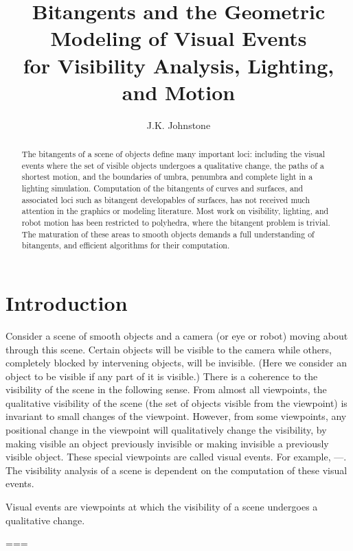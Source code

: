 \documentclass[11pt]{article}
\begin{document}
\title{Bitangents and the Geometric Modeling of Visual Events\\
	for Visibility Analysis, Lighting, and Motion}
\author{J.K. Johnstone}
\maketitle
	
\begin{abstract}
The bitangents of a scene of objects define many important loci:
including the visual events where the set of visible objects undergoes a qualitative change,
the paths of a shortest motion, and the boundaries of umbra, penumbra and complete light
in a lighting simulation.
Computation of the bitangents of curves and surfaces, and associated loci
such as bitangent developables of surfaces, has not received
much attention in the graphics or modeling literature.
Most work on visibility, lighting, and robot motion
has been restricted to polyhedra, where the bitangent problem is trivial.
The maturation of these areas to smooth objects demands a full understanding
of bitangents, and efficient algorithms for their computation.
\end{abstract}

\section{Introduction}

Consider a scene of smooth objects and a camera (or eye or robot)
moving about through this scene.
Certain objects will be visible to the camera while others, completely blocked by intervening
objects, will be invisible.
(Here we consider an object to be visible if any part of it is visible.)
There is a coherence to the visibility of the scene in the following sense.
From almost all viewpoints,
the qualitative visibility of the scene (the set of objects visible from
the viewpoint) is invariant to small changes of the viewpoint.
However, from some viewpoints, any positional change in the viewpoint
will qualitatively change the visibility, by making visible an object previously
invisible or making invisible a previously visible object.
These special viewpoints are called visual events.
For example, ---.
The visibility analysis of a scene is dependent on the computation
of these visual events.

Visual events are viewpoints at which the visibility of a scene
undergoes a qualitative change.

===
\end{document}
